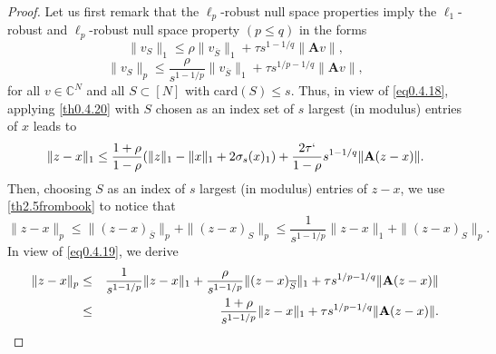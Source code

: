 \begin{proof}
    Let us first remark that the $\ell_p$-robust null space properties imply the $\ell_1$-robust and $\ell_p$-robust null space property $(p \leq q)$ in the forms
    \begin{equation}
        \|v_S\|_1 \leq \rho \|v_{\overline{S}}\|_1 + \tau s^{1-1/q}\|\mathbf{A}v\|,
        \label{eq0.4.18}
    \end{equation}
    \begin{equation}
        \|v_S\|_p \leq \frac{\rho}{s^{1-1/p}}\|v_{\overline{S}}\|_1 + \tau s^{1/p-1/q} \|\mathbf{A}v\|,
        \label{eq0.4.19}
    \end{equation}
    for all $v \in \mathbb{C}^N$ and all $S \subset [N]$ with card$(S) \leq s$. Thus, in view of \cref{eq0.4.18}, applying \cref{th0.4.20} with $S$ chosen as an index set of $s$ largest (in modulus) entries of $x$ leads to 
    \begin{equation}
         \|z-x\|_1 \leq \frac{1+\rho}{1-\rho}(\|z\|_1 - \|x\|_1 + 2\sigma_s(x)_1) + \frac{2\tau`}{1-\rho}s^{1-1/q} \|\mathbf{A}(z-x)\|.
        \label{eq0.4.20}
    \end{equation}
    Then, choosing $S$ as an index of $s$ largest (in modulus) entries of $z-x$, we use \cref{th2.5frombook} to notice that
    \[
        \|z-x\|_p \leq \|(z-x)_{\overline{S}}\|_p + \|(z-x)_S\|_p \leq \frac{1}{s^{1-1/p}} \|z-x\|_1 + \|(z-x)_S\|_p.
    \]
    In view of \cref{eq0.4.19}, we derive
    \begin{eqnarray}
        \label{eq0.4.21}
        \|z-x\|_p &\leq& \frac{1}{s^{1-1/p}} \|z-x\|_1 + \frac{\rho}{s^{1-1/p}} \|(z-x)_{\overline{S}}\|_1 + \tau s^{1/p-1/q} \|\mathbf{A}(z-x)\| \notag \\
        &\leq& \frac{1+\rho}{s^{1-1/p}} \|z-x\|_1 + \tau s^{1/p-1/q} \|\mathbf{A}(z-x)\|.
    \end{eqnarray}
\end{proof}

